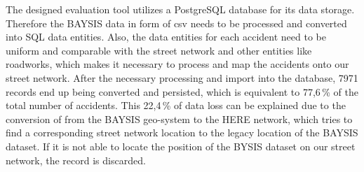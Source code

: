 
The designed evaluation tool utilizes a PostgreSQL database for its data storage. Therefore the BAYSIS data in form of \acrfull{csv} needs to be processed and converted into SQL data entities. Also, the data entities for each accident need to be uniform and comparable with the street network and other entities like roadworks, which makes it necessary to process and map the accidents onto our street network. After the necessary processing and import into the database, 7971 records end up being converted and persisted, which is equivalent to 77,6\,\% of the total number of accidents. This 22,4\,\% of data loss can be explained due to the conversion of from the BAYSIS geo-system to the HERE network, which tries to find a corresponding street network location to the legacy location of the BAYSIS dataset. If it is not able to locate the position of the BYSIS dataset on our street network, the record is discarded.

